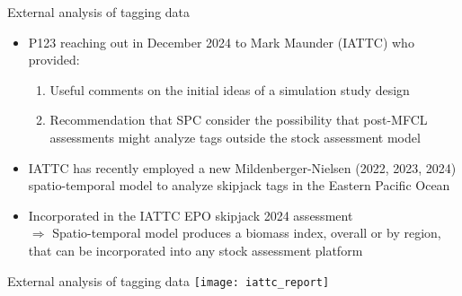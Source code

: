 \documentclass[aspectratio=169,fleqn]{beamer}
\begin{document}

\begin{frame}{External analysis of tagging data}
  \begin{itemize}
    \item[] P123 reaching out in December 2024 to Mark Maunder (IATTC) who
    provided:\\[0.5ex]
    \begin{enumerate}\normalsize
      \item Useful comments on the initial ideas of a simulation study
      design\\[1ex]
      \item Recommendation that SPC consider the possibility that post-MFCL
      assessments might analyze tags outside the stock assessment model\\[3ex]
    \end{enumerate}
    \item[] IATTC has recently employed a new Mildenberger-Nielsen (2022, 2023,
    2024)\\[0.2ex]
    spatio-temporal model to analyze skipjack tags in the Eastern Pacific
    Ocean\\[3ex]
    \item[] Incorporated in the IATTC EPO skipjack 2024 assessment\\[4ex]
    $\Rightarrow$ Spatio-temporal model produces a {\green biomass index},
    overall or by region,\\[0.2ex]
    \phantom{$\Rightarrow$} that can be incorporated into {\green any stock
      assessment platform}\\[3ex]
  \end{itemize}
\end{frame}


\begin{frame}{External analysis of tagging data}
  \centering
  \texttt{[image: iattc\_report]}
\end{frame}

\end{document}
